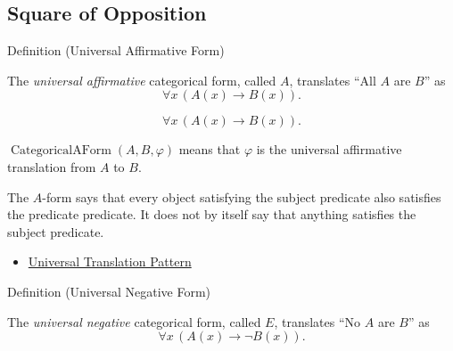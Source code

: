 
\subsection*{Square of Opposition}

\begin{definitionbox}{Definition (Universal Affirmative Form)}
\begin{definition}
\label{def:categorical-a-form-predicate-logic}
The \emph{universal affirmative} categorical form, called \(A\), translates
``All \(A\) are \(B\)'' as
\[
\forall x\,(A(x)\to B(x)).
\]
\end{definition}
\end{definitionbox}

\begin{remark*}
\[
\forall x\,(A(x)\to B(x)).
\]
\end{remark*}

\begin{remark*}
\(\operatorname{CategoricalAForm}(A,B,\varphi)\) means that \(\varphi\) is the
universal affirmative translation from \(A\) to \(B\).
\end{remark*}

\begin{remark*}[Interpretation]
The \(A\)-form says that every object satisfying the subject predicate also
satisfies the predicate predicate. It does not by itself say that anything
satisfies the subject predicate.
\end{remark*}

\begin{dependencies}
\begin{itemize}
  \item \hyperref[prop:universal-translation-pattern]{Universal Translation Pattern}
\end{itemize}
\end{dependencies}

\begin{definitionbox}{Definition (Universal Negative Form)}
\begin{definition}
\label{def:categorical-e-form-predicate-logic}
The \emph{universal negative} categorical form, called \(E\), translates
``No \(A\) are \(B\)'' as
\[
\forall x\,(A(x)\to \neg B(x)).
\]
\end{definition}
\end{definitionbox}

